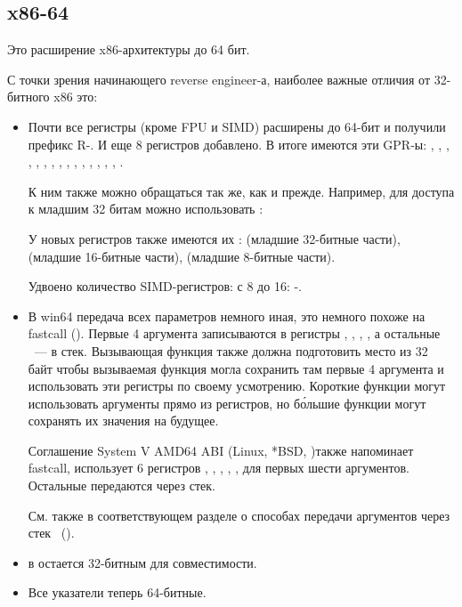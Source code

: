 
\subsection{x86-64}
\label{x86-64}

Это расширение x86-архитектуры до 64 бит.

С точки зрения начинающего reverse engineer-а, наиболее важные отличия от 32-битного x86 это:

\myindex{\CLanguageElements!\Pointers}
\begin{itemize}

\item
Почти все регистры (кроме FPU и SIMD) расширены до 64-бит и получили префикс R-. 
И еще 8 регистров добавлено. 
В итоге имеются эти \ac{GPR}-ы:
 \RAX, \RBX, \RCX, \RDX, 
\RBP, \RSP, \RSI, \RDI, , , , 
, , , , . 

К ним также можно обращаться так же, как и прежде. Например, для доступа к младшим 32 битам \RAX 
можно использовать \EAX:


У новых регистров  также имеются их :  
(младшие 32-битные части), 
 (младшие 16-битные части),  (младшие 8-битные части).


Удвоено количество SIMD-регистров: с 8 до 16: -.

\item
В win64 передача всех параметров немного иная, это немного похоже на fastcall 
().
Первые 4 аргумента записываются в регистры \RCX, \RDX, , , а остальные ~--- в стек. 
Вызывающая функция также должна подготовить место из 32 байт чтобы вызываемая функция могла сохранить 
там первые 4 аргумента и использовать эти регистры по своему усмотрению. 
Короткие функции могут использовать аргументы прямо из регистров, но б\'{о}льшие функции могут сохранять 
их значения на будущее.

Соглашение System V AMD64 ABI (Linux, *BSD, \MacOSX)\SysVABI также напоминает
fastcall, использует 6 регистров 
\RDI, \RSI, \RDX, \RCX, ,  для первых шести аргументов.
Остальные передаются через стек.

См. также в соответствующем разделе о способах передачи аргументов через стек ~().

\item
\Tint в \CCpp остается 32-битным для совместимости.

\item
Все указатели теперь 64-битные.

\end{itemize}

